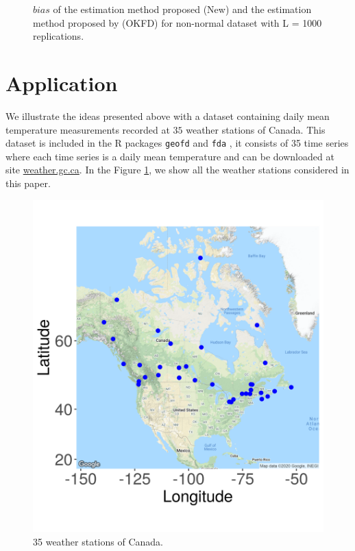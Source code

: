 \documentclass[]{interact}
\theoremstyle{plain}%
\theoremstyle{definition}
\theoremstyle{remark}
\begin{document}
\begin{figure}[htbp]
    \caption{$bias$ of the estimation method proposed (New) and the estimation method proposed by \cite{giraldo2011ordinary} (OKFD) for non-normal dataset with L = 1000 replications.}
\end{figure}

\newpage

\hypertarget{sec:application}{%
\section{Application}\label{sec:application}}

We illustrate the ideas presented above with a dataset containing daily mean temperature measurements recorded at \(35\) weather stations of Canada. This dataset is included in the R packages \texttt{geofd} and \texttt{fda} \citep[\citet{ramsay2018}]{giraldo2012geofd}, it consists of 35 time series where each time series is a daily mean temperature and can be downloaded at site \href{https://weather.gc.ca/}{weather.gc.ca}. In the Figure \ref{fig:weather-stations}, we show all the weather stations
considered in this paper.

\begin{figure}[!htbp]
    \centering

\begin{center}\includegraphics[width=0.55\linewidth]{figure/map_stations_canada} \end{center}
    \caption{35 weather stations  of Canada.}
    \label{fig:weather-stations}
\end{figure}
\end{document}
